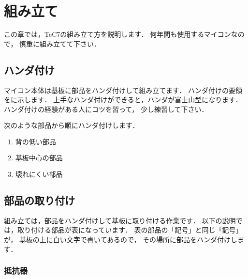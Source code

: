 \renewcommand{\myincludegraphics}[2]{\texttt{[image: chap3/\#1]}}

\chapter{組み立て\label{kumitate}}

この章では，TeC7の組み立て方を説明します．
何年間も使用するマイコンなので，
慎重に組み立てて下さい．

\section{ハンダ付け}

マイコン本体は基板に部品をハンダ付けして組み立てます．
ハンダ付けの要領をに示します．
上手なハンダ付けができると，ハンダが富士山型になります．
ハンダ付けの経験がある人にコツを習って，
少し練習して下さい．


次のような部品から順にハンダ付けします．

\begin{enumerate}
\item 背の低い部品
\item 基板中心の部品
\item 壊れにくい部品
\end{enumerate}

\section{部品の取り付け}
組み立ては，部品をハンダ付けして基板に取り付ける作業です．
以下の説明では，取り付ける部品が表になっています．
表の部品の「記号」と同じ「記号」が，
基板の上に白い文字で書いてあるので，
その場所に部品をハンダ付けします．

%

\subsection{抵抗器}

